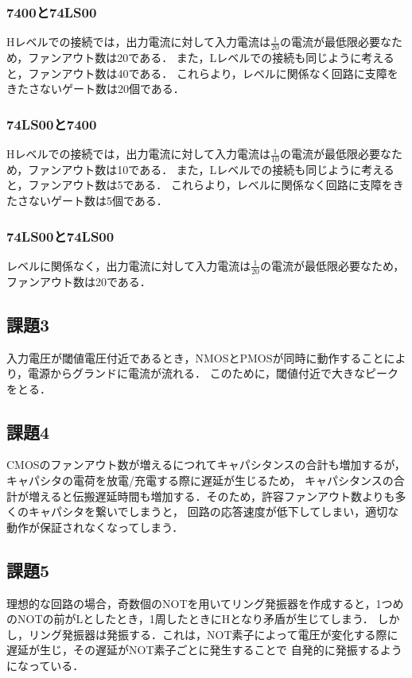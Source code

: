 \documentclass{jlreq}
\numberwithin{equation}{section}
\begin{document}
\subsubsection{7400と74LS00}
Hレベルでの接続では，出力電流に対して入力電流は$\frac{1}{20}$の電流が最低限必要なため，ファンアウト数は20である．
また，Lレベルでの接続も同じように考えると，ファンアウト数は40である．
これらより，レベルに関係なく回路に支障をきたさないゲート数は20個である．

\subsubsection{74LS00と7400}
Hレベルでの接続では，出力電流に対して入力電流は$\frac{1}{10}$の電流が最低限必要なため，ファンアウト数は10である．
また，Lレベルでの接続も同じように考えると，ファンアウト数は5である．
これらより，レベルに関係なく回路に支障をきたさないゲート数は5個である．

\subsubsection{74LS00と74LS00}
レベルに関係なく，出力電流に対して入力電流は$\frac{1}{20}$の電流が最低限必要なため，ファンアウト数は20である．

\subsection{課題3}
入力電圧が閾値電圧付近であるとき，NMOSとPMOSが同時に動作することにより，電源からグランドに電流が流れる．
このために，閾値付近で大きなピークをとる．

\subsection{課題4}
CMOSのファンアウト数が増えるにつれてキャパシタンスの合計も増加するが，キャパシタの電荷を放電/充電する際に遅延が生じるため，
キャパシタンスの合計が増えると伝搬遅延時間も増加する．そのため，許容ファンアウト数よりも多くのキャパシタを繋いでしまうと，
回路の応答速度が低下してしまい，適切な動作が保証されなくなってしまう．

\subsection{課題5}
理想的な回路の場合，奇数個のNOTを用いてリング発振器を作成すると，1つめのNOTの前がLとしたとき，1周したときにHとなり矛盾が生じてしまう．
しかし，リング発振器は発振する．これは，NOT素子によって電圧が変化する際に遅延が生じ，その遅延がNOT素子ごとに発生することで
自発的に発振するようになっている．
\end{document}
